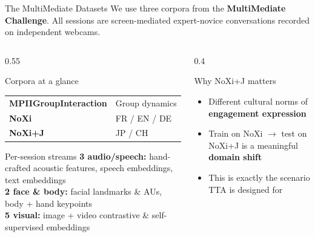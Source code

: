 \documentclass[aspectratio=169]{beamer}
\newcommand{\hl}[1]{\textcolor{coolpurple}{\textbf{#1}}}
\begin{document}
	\begin{frame}{The MultiMediate Datasets}
		We use three corpora from the \textbf{MultiMediate Challenge}. All sessions are screen-mediated expert-novice conversations recorded on independent webcams.
		
		\vspace{0.5em}
		\begin{columns}
			\begin{column}{0.55\textwidth}
				\begin{block}{Corpora at a glance}
					\small
					\begin{tabular}{ll}
						\textbf{MPIIGroupInteraction} & Group dynamics \\
						\textbf{NoXi} & FR / EN / DE \\
						\textbf{NoXi+J} & JP / CH
					\end{tabular}
				\end{block}
				\vspace{0.5em}
				\begin{block}{Per-session streams}
					\small
					\textbf{3 audio/speech:} hand-crafted acoustic features, speech embeddings, text embeddings \\[3pt]
					\textbf{2 face \& body:} facial landmarks \& AUs, body + hand keypoints \\[3pt]
					\textbf{5 visual:} image + video contrastive \& self-supervised embeddings \\[3pt]
				\end{block}
			\end{column}
			\begin{column}{0.4\textwidth}
				\begin{block}{Why NoXi+J matters}
					\small
					\begin{itemize}
						\item Different cultural norms of \hl{engagement expression}
						\item Train on NoXi $\to$ test on NoXi+J is a meaningful \textbf{domain shift}
						\item This is exactly the scenario TTA is designed for
					\end{itemize}
				\end{block}
			\end{column}
		\end{columns}
	\end{frame}
	
\end{document}
